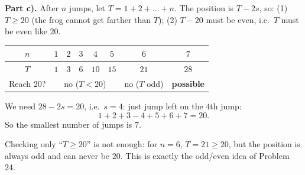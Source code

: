 {\par\smallskip\textbf{Part c).}
After $n$ jumps, let $T=1+2+\dots+n$. The position is $T-2s$, so: (1) $T\ge 20$ (the frog cannot get farther than $T$); (2) $T-20$ must be even, i.e.\ $T$ must be even like $20$.

\begin{center}
\begin{tabular}{|c|c|c|c|c|c|c|c|}
\hline
\rowcolor{Tint}$n$ & $1$ & $2$ & $3$ & $4$ & $5$ & $6$ & $7$\\
\hline
$T$ & $1$ & $3$ & $6$ & $10$ & $15$ & $21$ & $28$\\
\hline
Reach $20$? & \multicolumn{5}{c|}{no ($T<20$)} & no ($T$ odd) & \textbf{possible}\\
\hline
\end{tabular}
\end{center}

We need $28-2s=20$, i.e.\ $s=4$: just jump left on the $4$th jump:
\[1+2+3-4+5+6+7=20.\]
So the smallest number of jumps is $7$.

\begin{warnbox}Checking only ``$T\ge 20$'' is not enough: for $n=6$, $T=21\ge 20$, but the position is always odd and can never be $20$. This is exactly the odd/even idea of Problem 24.\end{warnbox}

}

